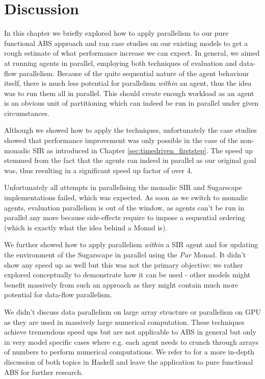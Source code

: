 \section{Discussion}
In this chapter we briefly explored how to apply parallelism to our pure functional ABS approach and ran case studies on our existing models to get a rough estimate of what performance increase we can expect. In general, we aimed at running agents in parallel, employing both techniques of evaluation and data-flow parallelism. Because of the quite sequential nature of the agent behaviour itself, there is much less potential for parallelism \textit{within} an agent, thus the idea was to run them all in parallel. This should create enough workload as an agent is an obvious unit of partitioning which can indeed be run in parallel under given circumstances.

Although we showed how to apply the techniques, unfortunately the case studies showed that performance improvement was only possible in the case of the non-monadic SIR as introduced in Chapter \ref{sec:timedriven_firststep}. The speed up stemmed from the fact that the agents ran indeed in parallel as our original goal was, thus resulting in a significant speed up factor of over 4. 

Unfortunately all attempts in parallelising the monadic SIR and Sugarscape implementations failed, which was expected. As soon as we switch to monadic agents, evaluation parallelism is out of the window, as agents can't be run in parallel any more because side-effects require to impose a sequential ordering (which is exactly what the idea behind a Monad is).

We further showed how to apply parallelism \textit{within} a SIR agent and for updating the environment of the Sugarscape in parallel using the \textit{Par} Monad. It didn't show any speed up as well but this was not the primary objective: we rather explored conceptually to demonstrate how it can be used - other models might benefit massively from such an approach as they might contain much more potential for data-flow parallelism.

We didn't discuss data parallelism on large array structure or parallelism on GPU as they are used in massively large numerical computation. These techniques achieve tremendous speed ups but are not applicable to ABS in general but only in very model specific cases where e.g. each agent needs to crunch through arrays of numbers to perform numerical computations. We refer to \cite{marlow_parallel_2013} for a more in-depth discussion of both topics in Haskell and leave the application to pure functional ABS for further research.

